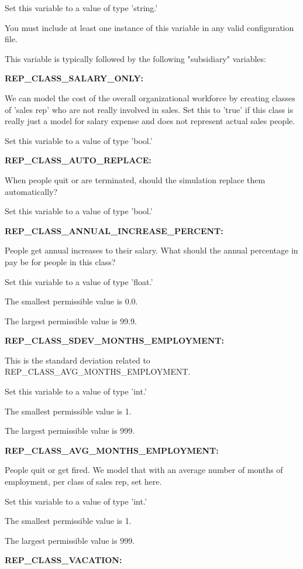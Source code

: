 Set this variable to a value of type 'string.'

You must include at least one instance of this variable in any valid configuration file.

This variable is typically followed by the following "subsidiary" variables:


\textbf{REP\_CLASS\_SALARY\_ONLY:}


We can model the cost of the overall organizational workforce by creating classes of 'sales rep' who are not really involved in sales.  Set this to 'true' if this class is really just a model for salary expense and does not represent actual sales people.

Set this variable to a value of type 'bool.'


\textbf{REP\_CLASS\_AUTO\_REPLACE:}


When people quit or are terminated, should the simulation replace them automatically?

Set this variable to a value of type 'bool.'


\textbf{REP\_CLASS\_ANNUAL\_INCREASE\_PERCENT:}


People get annual increases to their salary.  What should the annual percentage in pay be for people in this class?

Set this variable to a value of type 'float.'

The smallest permissible value is 0.0.

The largest permissible value is 99.9.


\textbf{REP\_CLASS\_SDEV\_MONTHS\_EMPLOYMENT:}


This is the standard deviation related to REP\_CLASS\_AVG\_MONTHS\_EMPLOYMENT.

Set this variable to a value of type 'int.'

The smallest permissible value is 1.

The largest permissible value is 999.


\textbf{REP\_CLASS\_AVG\_MONTHS\_EMPLOYMENT:}


People quit or get fired.  We model that with an average number of months of employment, per class of sales rep, set here.

Set this variable to a value of type 'int.'

The smallest permissible value is 1.

The largest permissible value is 999.


\textbf{REP\_CLASS\_VACATION:}



